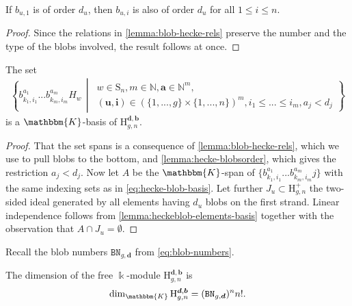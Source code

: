 \documentclass[a4paper,11pt]{amsart}
\renewcommand{\dots}{\text{...}}
\newcommand{\setstuff}[1]{\mathrm{#1}}
\newcommand{\KK}{\mathbbm{K}}
\newcommand{\N}{\mathbb{N}}
\newcommand{\bsym}[1]{\boldsymbol{#1}}
\newcommand{\varsym}[1]{\mathtt{#1}}
\newcommand{\bpar}{\bsym{b}}
\newcommand{\dpar}{\bsym{d}}
\newcommand{\bbvar}{\varsym{BN}}
\numberwithin{equation}{section}
\let\fullref\autoref
\begin{document}
\begin{lemma}\label{lemma:hecke-blobsorder}
If $b_{u,1}$ is of 
order $d_{u}$, then $b_{u,i}$ is also of 
order $d_{u}$ for all $1\leq i\leq n$.
\end{lemma}

\begin{proof}
Since the relations in \fullref{lemma:blob-hecke-rels} 
preserve the number and the type of the blobs involved,
the result follows at once.
\end{proof}

\begin{proposition}\label{proposition:heckeblobcyclo-elements-basis}
The set 
\begin{gather}\label{eq:hecke-blob-basis}
\left\{ 
b_{k_{1},i_{1}}^{a_{1}}\dots 
b_{k_{m},i_{m}}^{a_{m}}H_{w} 
\,\middle\vert\,
\begin{gathered}
w\in\setstuff{S}_{n},
m\in\N,
\bsym{a}\in\N^{m},
\\
(\bsym{u},\bsym{i})\in(\{1,\dots,g\}\times\{1,\dots,n\})^{m},
i_{1}\leq\dots\leq i_{m},a_{j}<d_{j}
\end{gathered}
\right\} 
\end{gather}
is a $\KK$-basis of $\setstuff{H}_{g,n}^{\dpar,\bpar}$.
\end{proposition}

\begin{proof}
That the set spans is a consequence 
of \fullref{lemma:blob-hecke-rels}, which we use to pull 
blobs to the bottom,
and \fullref{lemma:hecke-blobsorder}, which gives 
the restriction $a_{j}<d_{j}$.
Now let $A$ be the $\KK$-span of $\{b_{k_{1},i_{1}}^{a_{1}}\dots  b_{k_{m},i_{m}}^{a_{m}}j\}$ with the same indexing sets as in 
\eqref{eq:hecke-blob-basis}. Let further 
$J_{u}\subset\setstuff{H}_{g,n}^{+}$ 
the two-sided ideal 
generated by  all elements having $d_{u}$ blobs 
on the first strand. 
Linear independence follows from 
\fullref{lemma:heckeblob-elements-basis} 
together with the observation that $A\cap J_{u}=\emptyset$. 
\end{proof}

Recall the blob numbers $\bbvar_{g,\dpar}$ from \eqref{eq:blob-numbers}.

\begin{proposition}
The dimension of the 
free $\Bbbk$-module $\setstuff{H}_{g,n}^{\dpar,\bpar}$ is
\begin{gather*}
\dim_{\KK}\setstuff{H}_{g,n}^{\dpar,\bpar}
=(\bbvar_{g,\dpar})^{n}n!. 
\end{gather*}
\end{proposition}
\end{document}
